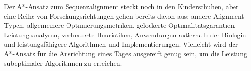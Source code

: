 Der A*-Ansatz zum Sequenzalignment steckt noch in den Kinderschuhen, aber eine
Reihe von Forschungsrichtungen gehen bereits davon aus: andere Alignment-Typen,
allgemeinere Optimierungsmetriken, gelockerte Optimalitätsgarantien,
Leistungsanalysen, verbesserte Heuristiken, Anwendungen außerhalb der Biologie
und leistungsfähigere Algorithmen und Implementierungen. Vielleicht wird der
A*-Ansatz für die Ausrichtung eines Tages ausgereift genug sein, um die Leistung
suboptimaler Algorithmen zu erreichen.
